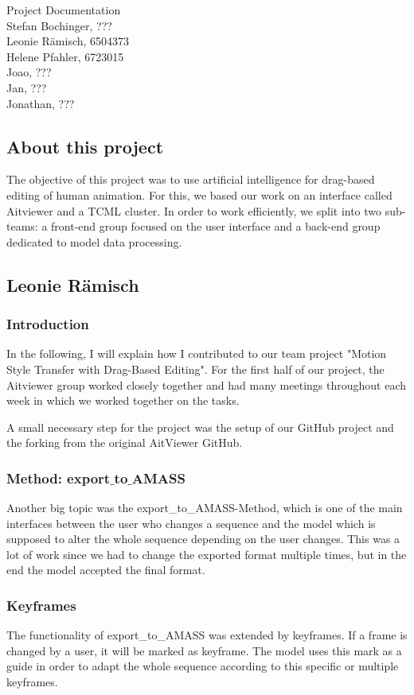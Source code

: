\documentclass[a4paper]{scrartcl}
\def\header#1#2{
  \begin{center}
    {\Large Project Documentation}\\
    {Stefan Bochinger, ???}\\
    {Leonie Rämisch, 6504373}\\
    {Helene Pfahler, 6723015}\\
    {Joao, ???}\\
    {Jan, ???}\\
    {Jonathan, ???}
  \end{center}
}
\begin{document}
\header{Nr. \NUMBER}{\DEADLINE}

\subsection*{About this project}
The objective of this project was to use artificial intelligence for drag-based editing of human animation. For this, we based our work on an interface called Aitviewer and a TCML cluster. 
In order to work efficiently, we split into two sub-teams: a front-end group focused on the user interface and a back-end group dedicated to model data processing.  


\subsection*{Leonie Rämisch}
\subsubsection*{Introduction}
In the following, I will explain how I contributed to our team project "Motion Style Transfer with Drag-Based Editing". For the first half of our project, the Aitviewer group worked closely together and had many meetings throughout each week in which we worked together on the tasks. 

A small necessary step for the project was the setup of our GitHub project and the forking from the original AitViewer GitHub.

\subsubsection*{Method: export$\_$to$\_$AMASS}
Another big topic was the export\_to\_AMASS-Method, which is one of the main interfaces between the user who changes a sequence and the model which is supposed to alter the whole sequence depending on the user changes. This was a lot of work since we had to change the exported format multiple times, but in the end the model accepted the final format.

\subsubsection*{Keyframes}
The functionality of export\_to\_AMASS was extended by keyframes. If a frame is changed by a user, it will be marked as keyframe. The model uses this mark as a guide in order to adapt the whole sequence according to this specific or multiple keyframes.
\end{document}
